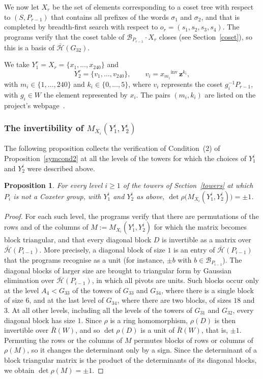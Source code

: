 \documentclass[11pt, reqno]{amsart}
\newcommand{\cB}{\mathcal{B}}
\newcommand{\cH}{\mathcal{H}}
\newcommand{\winv}[1]{{#1}^{\mathrm{inv}}}
\numberwithin{equation}{section}
\newtheorem{proposition}[theorem]{Proposition}
\theoremstyle{remark}
\begin{document}
We now let $X_r$ be the set of elements corresponding to a coset tree with respect to $(S,P_{r-1})$ that contains all prefixes of the words $\sigma_1$ and $\sigma_2$, and that is completed by breadth-first search with respect to $o_r=(s_1,s_2,s_3,s_4)$. The programs verify that the coset table of $\cB_{P_{r-1}}\cdot X_r$ closes (see Section~\ref{coset}), so this is a basis of $\bar{\cH}(G_{32})$. 

We take $Y^r_1=X_r=\{x_1,\dots,x_{240}\}$ and
\[
Y^r_2=\{v_1,\dots,v_{240}\},\qquad v_i=\winv{x_{m_i}}\,\mathbf z^{k_i},
\]
with $m_i\in\{1,\dots,240\}$ and $k_i\in\{0,\dots,5\}$, where $v_i$ represents the coset $g_i^{-1}P_{r-1}$, with $g_i\in W$ the element represented by $x_i$. The pairs $(m_i,k_i)$ are listed on the project's webpage~\cite{web}.
\subsubsection{The invertibility of $M_{X_i}(Y_1^i,Y_2^i)$}
The following proposition collects the verification of Condition~(2) of Proposition~\ref{symcond2} at all the levels of the towers for which the choices of $Y_1^i$ and $Y_2^i$ were described above.
\begin{proposition}\label{prop:Minv}
	For every level $i\ge1$ of the towers of Section~\ref{towers} at which $P_i$ is
	not a Coxeter group, with $Y_1^i$ and $Y_2^i$ as above,
	$\det\rho\big(M_{X_i}(Y_1^i,Y_2^i)\big)=\pm1$.
\end{proposition}

\begin{proof}
	For each such level, the programs verify that there are permutations of the rows and of the columns of $M:=M_{X_i}(Y_1^i,Y_2^i)$ for which the matrix becomes block triangular, and that every diagonal block $D$ is invertible as a matrix over $\bar{\cH}(P_{i-1})$. More precisely, a diagonal block of size $1$ is an entry of $\bar{\cH}(P_{i-1})$ that the programs recognise as a unit (for instance, $\pm b$ with $b\in\cB_{P_{i-1}}$). The diagonal blocks of larger size are brought to triangular form by Gaussian elimination over $\bar{\cH}(P_{i-1})$, in which all pivots are units. Such blocks occur only at the level $A_4<G_{33}$ of the towers of $G_{33}$ and $G_{34}$, where there is a single block of size $6$, and at the last level of $G_{34}$, where there are two blocks, of sizes $18$ and $3$. At all other levels, including all the levels of the towers of $G_{31}$ and $G_{32}$, every diagonal block has size $1$. Since $\rho$ is a ring homomorphism, $\rho(D)$ is then invertible over $\bar R(W)$, and so $\det\rho(D)$ is a unit of $\bar R(W)$, that is, $\pm1$. Permuting the rows or the columns of $M$ permutes blocks of rows or columns of $\rho(M)$, so it changes the determinant only by a sign. Since the determinant of a block triangular matrix is the product of the determinants of its diagonal blocks, we obtain $\det\rho(M)=\pm1$.
\end{proof}
\end{document}
